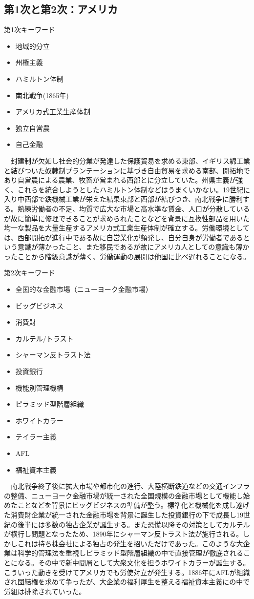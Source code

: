 \documentclass{jsarticle}
\begin{document}
\subsection{第1次と第2次：アメリカ}
第1次キーワード
\begin{itemize}
\item 地域的分立
\item 州権主義
\item ハミルトン体制
\item 南北戦争(1865年)
\item アメリカ式工業生産体制
\item 独立自営農
\item 自己金融
\end{itemize}
　封建制が欠如し社会的分業が発達した保護貿易を求める東部、イギリス綿工業と結びついた奴隷制プランテーションに基づき自由貿易を求める南部、開拓地であり自営農による農業、牧畜が営まれる西部とに分立していた。州県主義が強く、これらを統合しようとしたハミルトン体制などはうまくいかない。19世紀に入り中西部で鉄機械工業が栄えた結果東部と西部が結びつき、南北戦争に勝利する。熟練労働者の不足、均質で広大な市場と高水準な賃金、人口が分散しているが故に簡単に修理できることが求められたことなどを背景に互換性部品を用いた均一な製品を大量生産するアメリカ式工業生産体制が確立する。労働環境としては、西部開拓が進行中である故に自営業化が頻発し、自分自身が労働者であるという意識が薄かったこと、また移民であるが故にアメリカ人としての意識も薄かったことから階級意識が薄く、労働運動の展開は他国に比べ遅れることになる。

第2次キーワード
\begin{itemize}
\item 全国的な金融市場（ニューヨーク金融市場）
\item ビッグビジネス
\item 消費財
\item カルテル/トラスト
\item シャーマン反トラスト法
\item 投資銀行
\item 機能別管理機構
\item ピラミッド型階層組織
\item ホワイトカラー
\item テイラー主義
\item AFL
\item 福祉資本主義
\end{itemize}
　南北戦争終了後に拡大市場や都市化の進行、大陸横断鉄道などの交通インフラの整備、ニューヨーク金融市場が統一された全国規模の金融市場として機能し始めたことなどを背景にビッグビジネスの準備が整う。標準化と機械化を成し遂げた消費財企業が統一された金融市場を背景に誕生した投資銀行の下で成長し19世紀の後半には多数の独占企業が誕生する。また恐慌以降その対策としてカルテルが横行し問題となったため、1890年にシャーマン反トラスト法が施行される。しかしこれは持ち株会社による独占の発生を招いただけであった。このような大企業は科学的管理法を重視しピラミッド型階層組織の中で直接管理が徹底されることになる。その中で新中間層として大衆文化を担うホワイトカラーが誕生する。こういった動きを受けてアメリカでも労使対立が発生する。1886年にAFLが組織され団結権を求めて争ったが、大企業の福利厚生を整える福祉資本主義にの中で労組は排除されていった。
\end{document}

